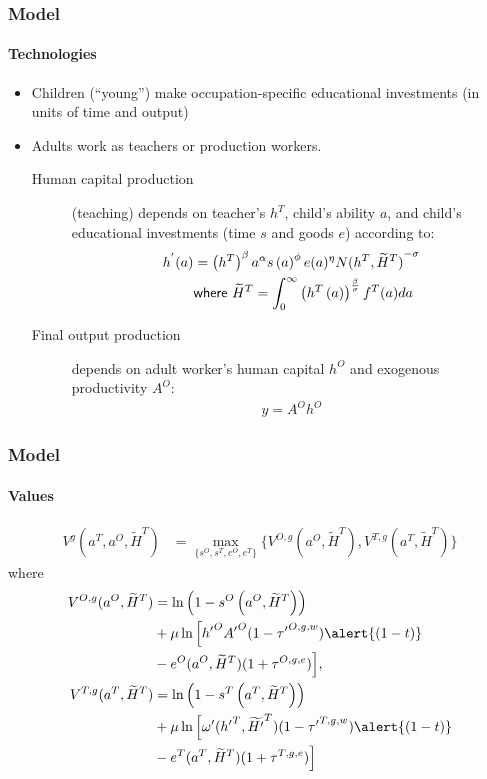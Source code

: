 \documentclass[11pt]{beamer}
\begin{document}
\begin{frame}
\frametitle{Model}
\framesubtitle{Technologies}
\begin{itemize}
  \item Children (``young'') make occupation-specific educational investments (in units of time and output)
  \item Adults work as \alert{teachers} or \alert{production workers}.
  \begin{description}
  \item[Human capital production] (teaching) depends on teacher's $h^T$, child's ability $a$, and child's educational investments (time $s$ and goods $e$) according to:
  \begin{align*}
\label{}
h^{'}(a) & = \left( h^T\right)^\beta a^\alpha s\left(a\right)^\phi e(a)^\eta {N(h^T,\widetilde{H}^T)}^{-\sigma} \\
& \textrm{{\sf where }} \widetilde{H}^T = \int_0^\infty \left( h^T\left( a \right) \right)^{\frac{\beta}{\sigma}} f^T(a) da
\end{align*}
  \item[Final output production] depends on adult worker's human capital $h^O$ and exogenous productivity $A^O$:
    \begin{align*}
\label{}
y = A^O h^O
\end{align*}
\end{description}
\end{itemize}
\end{frame}


\begin{frame}
\frametitle{Model}
\framesubtitle{Values}
\begin{align*}
V^g(a^T,a^O,\widetilde{H}^T) & = \max_{\{s^{O},s^{T},e^{O},e^{T}\}} \bigg\{ V^{O,g}(a^O,\widetilde{H}^T), V^{T,g}(a^T,\widetilde{H}^T) \bigg\}
\end{align*}
where
\begin{align*}
V^{O,g}(a^O,\widetilde{H}^T) & = \ln\left(1-s^O\left(a^O,\widetilde{H}^T\right)\right) \\
& + \mu \ln \Big[ {{h'}^{O}} {A'}^O(1-{{\tau'}^{O,g,w}})\alert{(1-t)} \\
& - e^O(a^O,\widetilde{H}^T)(1+\tau^{O,g,e}) \Big],  \\
V^{T,g}(a^T,\widetilde{H}^T) & = \ln\left(1-s^T\left(a^T,\widetilde{H}^T\right)\right)  \\
& + \mu \ln \Big[ \omega'({{h'}^{T}},{\widetilde{H'}^{T}})(1-{{\tau'}^{T,g,w}})\alert{(1-t)}  \\
& - e^T(a^T,\widetilde{H}^T)(1+\tau^{T,g,e}) \Big] 
\end{align*}
\end{frame}
\end{document}
